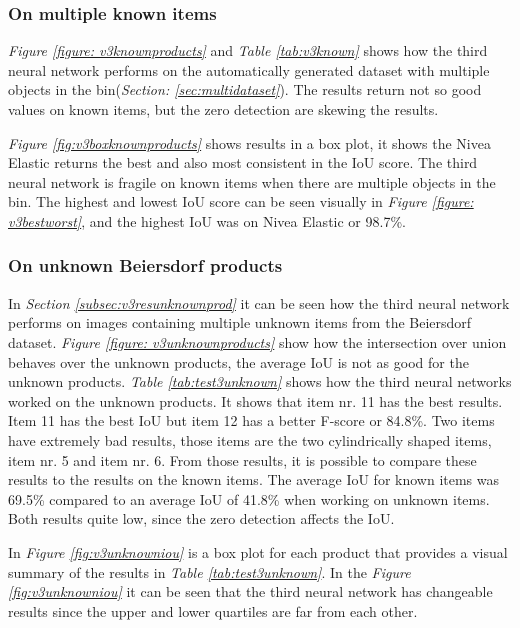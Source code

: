 \subsubsection{On multiple known items}
\textit{Figure \ref{figure: v3knownproducts}} and \textit{Table \ref{tab:v3known}} shows how the third neural network performs on the automatically generated dataset with multiple objects in the bin(\textit{Section: \ref{sec:multidataset}}). The results return not so good values on known items, but the zero detection are skewing the results.

\textit{Figure \ref{fig:v3boxknownproducts}} shows results in a box plot, it shows the Nivea Elastic returns the best and also most consistent in the IoU score. The third neural network is fragile on known items when there are multiple objects in the bin. The highest and lowest IoU score can be seen visually in \textit{Figure \ref{figure: v3bestworst}}, and the highest IoU was on Nivea Elastic or 98.7\%. 

\subsubsection{On unknown Beiersdorf products}
In \textit{Section \ref{subsec:v3resunknownprod}} it can be seen how the third neural network performs on images containing multiple unknown items from the Beiersdorf dataset. \textit{Figure \ref{figure: v3unknownproducts}} show how the intersection over union behaves over the unknown products, the average IoU is not as good for the unknown products. 
\textit{Table \ref{tab:test3unknown}} shows how the third neural networks worked on the unknown products. It shows that item nr. 11 has the best results. Item 11 has the best IoU but item 12 has a better F-score or 84.8\%. Two items have extremely bad results, those items are the two cylindrically shaped items, item nr. 5 and item nr. 6. From those results, it is possible to compare these results to the results on the known items. The average IoU for known items was 69.5\% compared to an average IoU of 41.8\% when working on unknown items. Both results quite low, since the zero detection affects the IoU.



In \textit{Figure \ref{fig:v3unknowniou}} is a box plot for each product that provides a visual summary of the results in \textit{Table \ref{tab:test3unknown}}. In the \textit{Figure \ref{fig:v3unknowniou}} it can be seen that the third neural network has changeable results since the upper and lower quartiles are far from each other.



